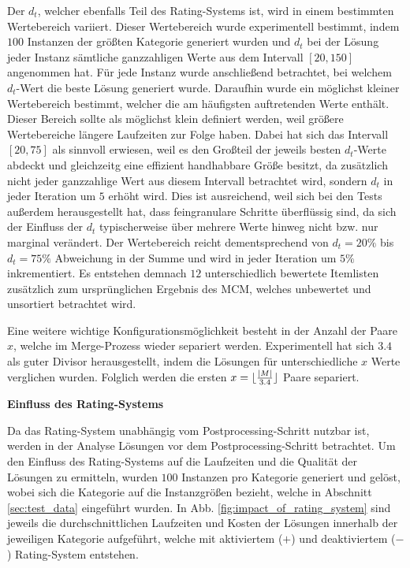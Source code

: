 Der  $d_t$, welcher ebenfalls Teil des Rating-Systems ist, wird in einem bestimmten
Wertebereich variiert. Dieser Wertebereich wurde experimentell bestimmt, indem $100$ Instanzen der größten Kategorie generiert
wurden und $d_t$ bei der Lösung jeder Instanz sämtliche ganzzahligen Werte aus dem Intervall $[20, 150]$ angenommen hat.
Für jede Instanz wurde anschließend betrachtet, bei welchem $d_t$-Wert die beste Lösung generiert wurde.
Daraufhin wurde ein möglichst kleiner Wertebereich bestimmt, welcher die am häufigsten auftretenden Werte enthält.
Dieser Bereich sollte als möglichst klein definiert werden, weil größere Wertebereiche längere Laufzeiten zur Folge haben.
Dabei hat sich das Intervall $[20, 75]$ als sinnvoll erwiesen, weil es den Großteil der jeweils besten $d_t$-Werte
abdeckt und gleichzeitg eine effizient handhabbare Größe besitzt, da zusätzlich nicht jeder ganzzahlige Wert aus diesem Intervall betrachtet wird, sondern $d_t$ in jeder Iteration um $5$ erhöht wird. Dies ist ausreichend, weil sich bei den Tests außerdem herausgestellt hat, dass feingranulare Schritte überflüssig sind, da sich der Einfluss der $d_t$ typischerweise über mehrere Werte hinweg nicht bzw. nur marginal verändert. Der Wertebereich reicht dementsprechend von
$d_t = 20 \%$ bis $d_t = 75 \%$ Abweichung in der Summe und wird in jeder Iteration um $5 \%$ inkrementiert.
Es entstehen demnach $12$ unterschiedlich bewertete Itemlisten zusätzlich zum ursprünglichen Ergebnis des \textsc{MCM},
welches unbewertet und unsortiert betrachtet wird.

Eine weitere wichtige Konfigurationsmöglichkeit besteht in der Anzahl der Paare $x$, welche im Merge-Prozess wieder
separiert werden. Experimentell hat sich $3.4$ als guter Divisor herausgestellt, indem die Lösungen für unterschiedliche $x$ Werte verglichen wurden. Folglich werden die ersten $x = \lfloor\frac{|M|}{3.4}\rfloor$ Paare separiert.

\textbf{Einfluss des Rating-Systems}

Da das Rating-System unabhängig vom Postprocessing-Schritt nutzbar ist, werden in der Analyse Lösungen vor dem Postprocessing-Schritt betrachtet. Um den Einfluss des Rating-Systems auf die Laufzeiten und die Qualität der
Lösungen zu ermitteln, wurden $100$ Instanzen pro Kategorie generiert und gelöst, wobei sich die Kategorie
auf die Instanzgrößen bezieht, welche in Abschnitt \ref{sec:test_data} eingeführt wurden.
In Abb. \ref{fig:impact_of_rating_system} sind jeweils die durchschnittlichen Laufzeiten und Kosten der Lösungen
innerhalb der jeweiligen Kategorie aufgeführt, welche mit aktiviertem ($+$) und deaktiviertem ($-$)
Rating-System entstehen.

